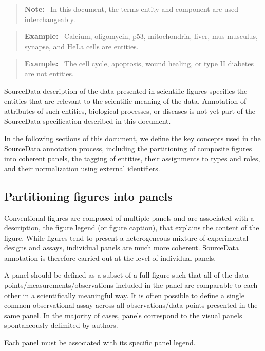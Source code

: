 \documentclass{bioinfo}
\newenvironment{note}
{\par\color{black}\begin{quote}\textbf{Note:}\ }
{\end{quote}\par}
\newenvironment{example}
{\par\color{black}\begin{quote}\textbf{Example:}\ }
{\end{quote}\par}
\begin{document}
\begin{note}
    In this document, the terms entity and component are used interchangeably.
\end{note}

\begin{example}
    Calcium, oligomycin, p53, mitochondria, liver, mus musculus, synapse, and HeLa cells are entities.
\end{example}

\begin{example}
    The cell cycle, apoptosis, wound healing, or type II diabetes are not entities.
\end{example}

SourceData description of the data presented in scientific figures specifies the entities that are relevant to the scientific meaning of the data. Annotation of attributes of such entities, biological processes, or diseases is not yet part of the SourceData specification described in this document.

In the following sections of this document, we define the key concepts used in the SourceData annotation process, including the partitioning of composite figures into coherent panels, the tagging of entities, their assignments to types and roles, and their normalization using external identifiers.

\subsection{Partitioning figures into panels}\label{app:partitioning-figures-into-panels}

Conventional figures are composed of multiple panels and are associated with a description, the figure legend (or figure caption), that explains the content of the figure. While figures tend to present a heterogeneous mixture of experimental designs and assays, individual panels are much more coherent. SourceData annotation is therefore carried out at the level of individual panels.

A panel should be defined as a subset of a full figure such that all of the data points/measurements/observations included in the panel are comparable to each other in a scientifically meaningful way. It is often possible to define a single common observational assay across all observations/data points presented in the same panel. In the majority of cases, panels correspond to the visual panels spontaneously delimited by authors.

Each panel must be associated with its specific panel legend.
\end{document}
